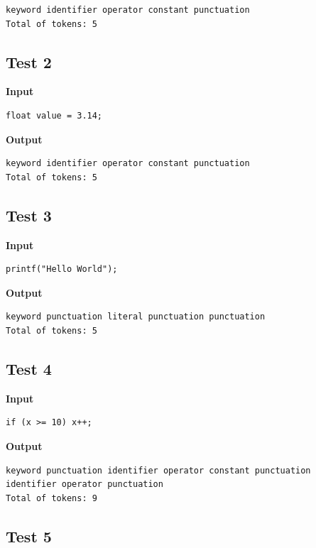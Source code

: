 \documentclass[letterpaper,12pt,oneside]{article}
\begin{document}
\begin{verbatim}
keyword identifier operator constant punctuation
Total of tokens: 5
\end{verbatim}

\subsection{Test 2}

\textbf{Input}

\begin{verbatim}
float value = 3.14;
\end{verbatim}

\textbf{Output}

\begin{verbatim}
keyword identifier operator constant punctuation
Total of tokens: 5
\end{verbatim}

\subsection{Test 3}

\textbf{Input}

\begin{verbatim}
printf("Hello World");
\end{verbatim}

\textbf{Output}

\begin{verbatim}
keyword punctuation literal punctuation punctuation
Total of tokens: 5
\end{verbatim}

\subsection{Test 4}

\textbf{Input}

\begin{verbatim}
if (x >= 10) x++;
\end{verbatim}

\textbf{Output}

\begin{verbatim}
keyword punctuation identifier operator constant punctuation
identifier operator punctuation
Total of tokens: 9
\end{verbatim}

\subsection{Test 5}
\end{document}
